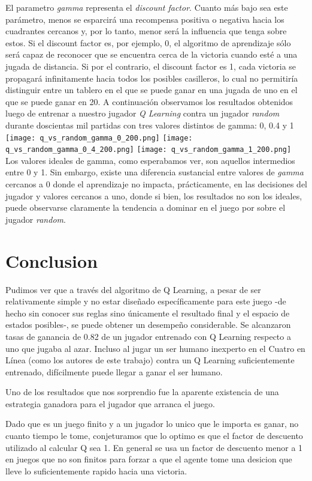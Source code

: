 \documentclass[10pt,a4paper]{article}
\begin{document}
El parametro \textit{gamma} representa el \textit{discount factor}. Cuanto más bajo sea este parámetro, menos se esparcirá una recompensa positiva o negativa hacia los cuadrantes cercanos y, por lo tanto, menor será la influencia que tenga sobre estos. Si el discount factor es, por ejemplo, 0, el algoritmo de aprendizaje sólo será capaz de reconocer que se encuentra cerca de la victoria cuando esté a una jugada de distancia. Si por el contrario, el discount factor es 1, cada victoria se propagará infinitamente hacia todos los posibles casilleros, lo cual no permitiría distinguir entre un tablero en el que se puede ganar en una jugada de uno en el que se puede ganar en 20. A continuación observamos los resultados obtenidos luego de entrenar a nuestro jugador \textit{Q Learning} contra un jugador \textit{random} durante doscientas mil partidas con tres valores distintos de gamma: 0, 0.4 y 1
\\
\texttt{[image: q\_vs\_random\_gamma\_0\_200.png]}
\texttt{[image: q\_vs\_random\_gamma\_0\_4\_200.png]}
\texttt{[image: q\_vs\_random\_gamma\_1\_200.png]}
\\

Los valores ideales de gamma, como esperabamos ver, son aquellos intermedios entre 0 y 1. Sin embargo, existe una diferencia sustancial entre valores de \textit{gamma} cercanos a 0 donde el aprendizaje no impacta, prácticamente, en las decisiones del jugador y valores cercanos a uno, donde si bien, los resultados no son los ideales, puede observarse claramente la tendencia a dominar en el juego por sobre el jugador \textit{random}.

\section{Conclusion}

Pudimos ver que a través del algoritmo de Q Learning, a pesar de ser relativamente simple y no estar diseñado específicamente para este juego -de hecho sin conocer sus reglas sino únicamente el resultado final y el espacio de estados posibles-, se puede obtener un desempeño considerable. Se alcanzaron tasas de ganancia de 0.82 de un jugador entrenado con Q Learning respecto a uno que jugaba al azar. Incluso al jugar un ser humano inexperto en el Cuatro en Línea (como los autores de este trabajo) contra un Q Learning suficientemente entrenado, difícilmente puede llegar a ganar el ser humano.

Uno de los resultados que nos sorprendio fue la aparente existencia de una estrategia ganadora para el jugador que arranca el juego.

Dado que es un juego finito y a un jugador lo unico que le importa es ganar, no cuanto tiempo le tome, conjeturamos que lo optimo es que el factor de descuento utilizado al calcular Q sea 1. En general se usa un factor de descuento menor a 1 en juegos que no son finitos para forzar a que el agente tome una desicion que lleve lo suficientemente rapido hacia una victoria.
\end{document}
